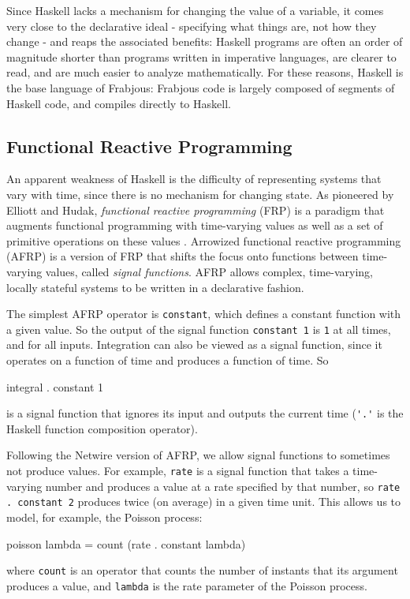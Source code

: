 \documentclass[oribibl]{llncs}
\begin{document}
  Since Haskell lacks a mechanism for changing the value of a variable, it comes very close to the declarative ideal - specifying what things are, not how they change - and reaps the associated benefits: Haskell programs are often an order of magnitude shorter than programs written in imperative languages, are clearer to read, and are much easier to analyze mathematically. For these reasons, Haskell is the base language of Frabjous: Frabjous code is largely composed of segments of Haskell code, and compiles directly to Haskell.
  
\subsection{Functional Reactive Programming}
\label{frp}
  An apparent weakness of Haskell is the difficulty of representing systems that vary with time, since there is no mechanism for changing state.  As pioneered by Elliott and Hudak, \emph{functional reactive programming} (FRP) is a paradigm that augments functional programming with time-varying values as well as a set of primitive operations on these values \cite{fran}. Arrowized functional reactive programming (AFRP) is a version of FRP that shifts the focus onto functions between time-varying values, called \emph{signal functions}\cite{frpcont}. AFRP allows complex, time-varying, locally stateful systems to be written in a declarative fashion\cite{yampa}. 
  
  The simplest AFRP operator is \lstinline{constant}, which defines a constant function with a given value. So the output of the signal function \lstinline{constant 1} is \lstinline{1} at all times, and for all inputs. 
  Integration can also be viewed as a signal function, since it operates on a function of time and produces a function of time. So
\begin{code}
	integral . constant 1
\end{code}
is a signal function that ignores its input and outputs the current time (\lstinline{'.'} is the Haskell function composition operator). 

  Following the Netwire version of AFRP\cite{netwire}, we allow signal functions to sometimes not produce values. For example, \lstinline{rate} is a signal function that takes a time-varying number and produces a value at a rate specified by that number, so \lstinline{rate . constant 2} produces twice (on average) in a given time unit. This allows us to model, for example, the Poisson process: 
\begin{code}
	poisson lambda = count (rate . constant lambda)
\end{code}
where \lstinline{count} is an operator that counts the number of instants that its argument produces a value, and \lstinline{lambda} is the rate parameter of the Poisson process. 
\end{document}
